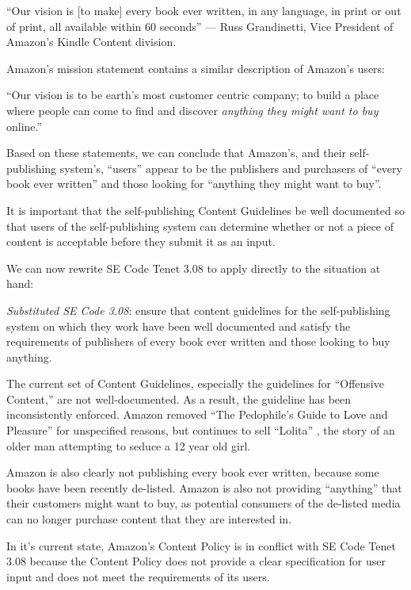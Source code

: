 \documentclass[11pt]{article}
\begin{document}
\begin{multicols}{2}
``Our vision is [to make] every book ever written, in any language, in print or out of print, all available within 60 seconds'' --- Russ Grandinetti, Vice President of Amazon's Kindle Content division. \cite{LATimesRussQuote}

Amazon's mission statement contains a similar description of Amazon's users:

``Our vision is to be earth's most customer centric company; to build a place where people can come to find and discover \emph{anything they might want to buy} online.'' \cite[Emphasis Mine]{AmazonIRFAQ}

Based on these statements, we can conclude that Amazon's, and their self-publishing system's, ``users'' appear to be the publishers and purchasers of ``every book ever written'' and those looking for ``anything they might want to buy''.

It is important that the self-publishing Content Guidelines be well documented so that users of the self-publishing system can determine whether or not a piece of content is acceptable before they submit it as an input.

We can now rewrite SE Code Tenet 3.08 to apply directly to the situation at hand:

\emph{Substituted SE Code 3.08}: ensure that content guidelines for the self-publishing system on which they work have been well documented and satisfy the requirements of publishers of every book ever written and those looking to buy anything.

The current set of Content Guidelines, especially the guidelines for ``Offensive Content,'' are not well-documented.  As a result, the guideline has been inconsistently enforced.  Amazon removed ``The Pedophile's Guide to Love and Pleasure'' for unspecified reasons, but continues to sell ``Lolita'' \cite{AmazonLolitaDTPListing}, the story of an older man attempting to seduce a 12 year old girl. 

Amazon is also clearly not publishing every book ever written, because some books have been recently de-listed.  Amazon is also not providing ``anything'' that their customers might want to buy, as potential consumers of the de-listed media can no longer purchase content that they are interested in.

In it's current state, Amazon's Content Policy is in conflict with SE Code Tenet 3.08 because the Content Policy does not provide a clear specification for user input and does not meet the requirements of its users.


\end{multicols}
\end{document}
